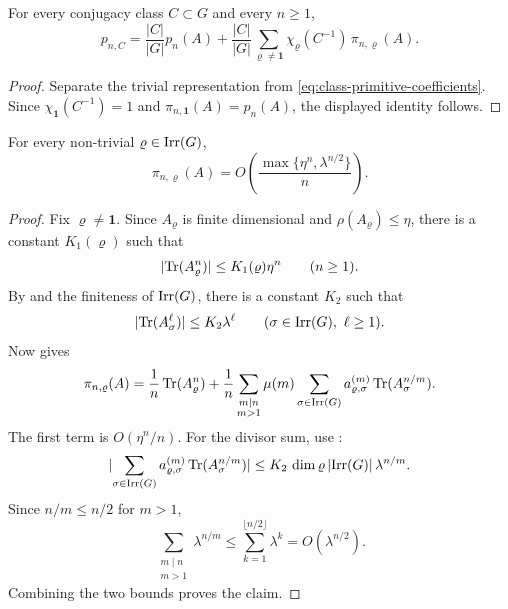 \begin{lemma}
  \label{lem:class-primitive-trivial-split}
  For every conjugacy class \(C\subset G\) and every \(n\ge 1\),
  \[
    p_{n,C}
    =
    \frac{|C|}{|G|}p_n(A)
    +\frac{|C|}{|G|}
      \sum_{\varrho\neq\mathbf 1}
        \chi_\varrho(C^{-1})\,\pi_{n,\varrho}(A).
  \]
\end{lemma}

\begin{proof}
  Separate the trivial representation from
  \eqref{eq:class-primitive-coefficients}. Since
  \(\chi_{\mathbf 1}(C^{-1})=1\) and
  \(\pi_{n,\mathbf 1}(A)=p_n(A)\), the displayed identity follows.
\end{proof}

\begin{lemma}
  \label{lem:nontrivial-peter-weyl-channel-bound}
  For every non-trivial \(\varrho\in\operatorname{Irr}(G)\),
  \[
    \pi_{n,\varrho}(A)
    =O\!\left(\frac{\max\{\eta^n,\lambda^{n/2}\}}{n}\right).
  \]
\end{lemma}

\begin{proof}
  Fix \(\varrho\neq\mathbf 1\). Since \(A_\varrho\) is finite
  dimensional and \(\rho(A_\varrho)\le \eta\), there is a constant
  \(K_1(\varrho)\) such that
  \[
    \lvert \operatorname{Tr}(A_\varrho^n) \rvert\le K_1(\varrho)\eta^n
    \qquad (n\ge 1).
  \]
  By  and the finiteness of
  \(\operatorname{Irr}(G)\), there is a constant \(K_2\) such that
  \[
    \lvert \operatorname{Tr}(A_\sigma^\ell) \rvert\le K_2\lambda^\ell
    \qquad
    (\sigma\in\operatorname{Irr}(G),\ \ell\ge 1).
  \]
  Now  gives
  \[
    \pi_{n,\varrho}(A)
    =
    \frac{1}{n}\operatorname{Tr}(A_\varrho^n)
    +\frac{1}{n}
      \sum_{\substack{m\mid n\\ m>1}}\mu(m)
        \sum_{\sigma\in\operatorname{Irr}(G)}
          a_{\varrho,\sigma}^{(m)}\operatorname{Tr}(A_\sigma^{n/m}).
  \]
  The first term is \(O(\eta^n/n)\). For the divisor sum, use
  :
  \[
    \lvert 
      \sum_{\sigma\in\operatorname{Irr}(G)}
        a_{\varrho,\sigma}^{(m)}\operatorname{Tr}(A_\sigma^{n/m})
     \rvert
    \le
    K_2\,\dim\varrho\,\lvert \operatorname{Irr}(G) \rvert\,\lambda^{n/m}.
  \]
  Since \(n/m\le n/2\) for \(m>1\),
  \[
    \sum_{\substack{m\mid n\\ m>1}}\lambda^{n/m}
    \le \sum_{k=1}^{\lfloor n/2\rfloor}\lambda^k
    =O(\lambda^{n/2}).
  \]
  Combining the two bounds proves the claim.
\end{proof}

